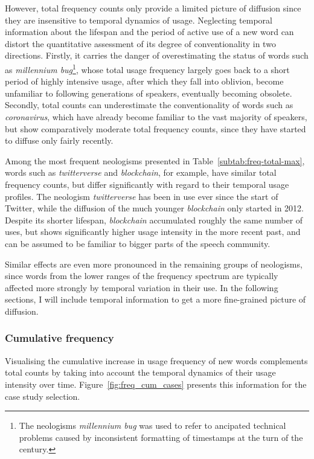 \documentclass[
  a4paper,
  abstract=on,
  captions=tableabove,
  ]{scrartcl}
\newcommand{\ol}[1]{\emph{#1}}
\begin{document}
      However, total frequency counts only provide a limited picture of diffusion since they are insensitive to temporal dynamics of usage. Neglecting temporal information about the lifespan and the period of active use of a new word can distort the quantitative assessment of its degree of conventionality in two directions. Firstly, it carries the danger of overestimating the status of words such as \ol{millennium bug}\footnote{The neologisms \ol{millennium bug} was used to refer to ancipated technical problems caused by inconsistent formatting of timestamps at the turn of the century.}, whose total usage frequency largely goes back to a short period of highly intensive usage, after which they fall into oblivion, become unfamiliar to following generations of speakers, eventually becoming obsolete. Secondly, total counts can underestimate the conventionality of words such as \ol{coronavirus}, which have already become familiar to the vast majority of speakers, but show comparatively moderate total frequency counts, since they have started to diffuse only fairly recently.

      Among the most frequent neologisms presented in Table~\ref{subtab:freq-total-max}, words such as \ol{twitterverse} and \ol{blockchain}, for example, have similar total frequency counts, but differ significantly with regard to their temporal usage profiles. The neologism \ol{twitterverse} has been in use ever since the start of Twitter, while the diffusion of the much younger \ol{blockchain} only started in 2012. Despite its shorter lifespan, \ol{blockchain} accumulated roughly the same number of uses, but shows significantly higher usage intensity in the more recent past, and can be assumed to be familiar to bigger parts of the speech community.

      Similar effects are even more pronounced in the remaining groups of neologisms, since words from the lower ranges of the frequency spectrum are typically affected more strongly by temporal variation in their use. In the following sections, I will include temporal information to get a more fine-grained picture of diffusion.


    \subsubsection{Cumulative frequency}

      Visualising the cumulative increase in usage frequency of new words complements total counts by taking into account the temporal dynamics of their usage intensity over time. Figure~\ref{fig:freq_cum_cases} presents this information for the case study selection.
\end{document}
